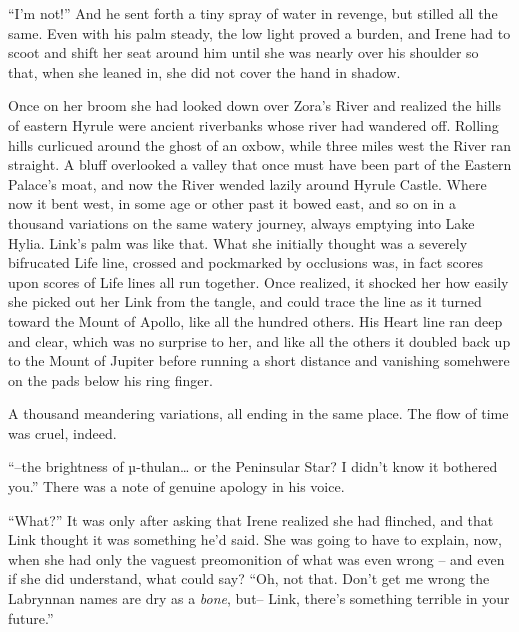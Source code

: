 \documentclass[../FGP.tex]{subfiles}
\begin{document}
 ``I'm not!'' And he sent forth a tiny spray of water in revenge, but stilled all the same. Even with his palm steady, the low light proved a burden, and Irene had to scoot and shift her seat around him until she was nearly over his shoulder so that, when she leaned in, she did not cover the hand in shadow.

Once on her broom she had looked down over Zora's River and realized the hills of eastern Hyrule were ancient riverbanks whose river had wandered off.%
    \normalmarginpar{}
Rolling hills curl\-i\-cued around the ghost of an oxbow, while three miles west the River ran straight. A bluff overlooked a valley that once must have been part of the Eastern Palace's moat, and now the River wended lazily around Hyrule Castle. Where now it bent west, in some age or other past it bowed east, and so on in a thousand variations on the same watery journey, always emptying into Lake Hylia. Link's palm was like that. What she initially thought was a severely bifrucated Life line, crossed and pockmarked by occlusions was, in  fact scores upon scores of Life lines all run together. Once realized, it shocked her how easily she picked out her Link from the tangle, and could trace the line as it turned toward the Mount of Apollo, like all the hundred others. His Heart line ran deep and clear, which was no surprise to her, and like all the others it doubled back up to the Mount of Jupiter before running a short distance and vanishing somehwere on the pads below his ring finger. 

A thousand meandering variations, all ending in the same place. The flow of time was cruel, indeed.

\normalmarginpar``--the brightness of {\Gr µ}-thulan\ldots{} or the Peninsular Star? I didn't know it bothered you.'' There was a note of genuine apology in his voice.

``What?'' It was only after asking that Irene realized she had flinched, and that Link thought it was something he'd said. She was going to have to explain, now, when she had only the vaguest preomonition of what was even wrong -- and even if she did understand, what could say? ``Oh, not that. Don't get me wrong the Labrynnan names are dry as a \emph{bone}, but-- Link, there's something terrible in your future.''  
\end{document}
